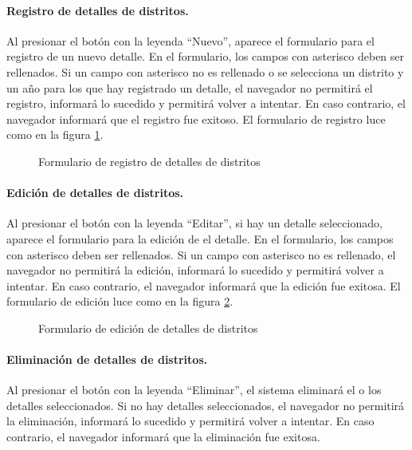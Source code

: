 \documentclass[a4paper, 9pt, conference]{article}              %
\begin{document}
\paragraph{Registro de detalles de distritos.}

Al presionar el bot\'on con la leyenda ``Nuevo'', aparece el formulario para el registro de un nuevo detalle. En el formulario, los campos con asterisco deben ser rellenados. Si un campo con asterisco no es rellenado o se selecciona un distrito y un a\~no para los que hay registrado un detalle, el navegador no permitir\'a el registro, informar\'a lo sucedido y permitir\'a volver a intentar. En caso contrario, el navegador informar\'a que el registro fue exitoso. El formulario de registro luce como en la figura \ref{fig:geodistrictsdetailnew}.

\begin{figure}
	\centering
		\caption{Formulario de registro de detalles de distritos}
	\label{fig:geodistrictsdetailnew}
\end{figure}

\paragraph{Edici\'on de detalles de distritos.}

Al presionar el bot\'on con la leyenda ``Editar'', si hay un detalle seleccionado, aparece el formulario para la edici\'on de el detalle. En el formulario, los campos con asterisco deben ser rellenados. Si un campo con asterisco no es rellenado, el navegador no permitir\'a la edici\'on, informar\'a lo sucedido y permitir\'a volver a intentar. En caso contrario, el navegador informar\'a que la edici\'on fue exitosa. El formulario de edici\'on luce como en la figura \ref{fig:geodistrictsdetailedit}.

\begin{figure}
	\centering
		\caption{Formulario de edici\'on de detalles de distritos}
	\label{fig:geodistrictsdetailedit}
\end{figure}

\paragraph{Eliminaci\'on de detalles de distritos.}

Al presionar el bot\'on con la leyenda ``Eliminar'', el sistema eliminar\'a el o los detalles seleccionados. Si no hay detalles seleccionados, el navegador no permitir\'a la eliminaci\'on, informar\'a lo sucedido y permitir\'a volver a intentar. En caso contrario, el navegador informar\'a que la eliminaci\'on fue exitosa.
\end{document}
